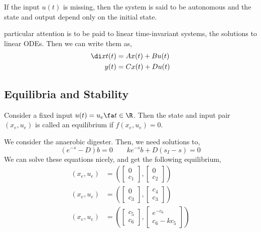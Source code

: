 \begin{ndefi}[Autonomous]
  If the input $u(t)$ is missing, then the system is said to be autonomous and the state and output depend only on the initial state.
\end{ndefi}

particular attention is to be paid to linear time-invariant systems, the solutions to linear ODEs. Then we can write them as,
\begin{align*}
  \di x t (t) &= Ax(t) + Bu(t)\\
  y(t) &= Cx(t) + Du(t)
\end{align*}

\subsection{Equilibria and Stability}

\begin{ndefi}[Equilibrium]
  Consider a fixed input $u(t) = u_e \fa t \in \R$. Then the state and input pair $(x_e, u_e)$ is called an equilibrium if $f(x_e, u_e) = 0$.
\end{ndefi}

\begin{eg}
  We consider the anaerobic digester. Then, we need solutions to,
  $$ (e^{-s} - D)b = 0 \qquad ke^{-s}b + D(s_I - s) = 0 $$
  We can solve these equations nicely, and get the following equilibrium,
  \begin{align*}
    (x_e, u_e) &=\left( \begin{bmatrix}
      0 \\ c_1
    \end{bmatrix}, \begin{bmatrix}
      0 \\ c_2
    \end{bmatrix} \right)\\
    (x_e, u_e) &= \left( \begin{bmatrix}
      0 \\ c_3
    \end{bmatrix}, \begin{bmatrix}
      c_4 \\ c_3
    \end{bmatrix} \right)\\
    (x_e, u_e) &= \left( \begin{bmatrix}
      c_5 \\ c_6
    \end{bmatrix}, \begin{bmatrix}
      e^{-c_6} \\ c_6 - kc_5
    \end{bmatrix} \right)
  \end{align*}
\end{eg}

